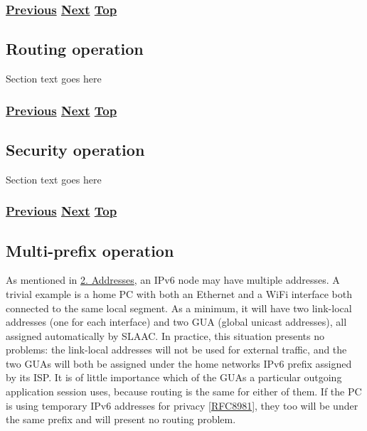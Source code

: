 \documentclass[
]{article}
\begin{document}
\subsubsection{\texorpdfstring{\hyperref[remote-configuration]{Previous}
\hyperref[routing-operation]{Next}
\hyperref[management-and-operations]{Top}}{Previous Next Top}}\label{previous-next-top-22}

\pagebreak

\subsection{Routing operation}\label{routing-operation}

Section text goes here

\subsubsection{\texorpdfstring{\hyperref[benchmarking-and-monitoring]{Previous}
\hyperref[security-operation]{Next}
\hyperref[management-and-operations]{Top}}{Previous Next Top}}\label{previous-next-top-23}

\pagebreak

\subsection{Security operation}\label{security-operation}

Section text goes here

\subsubsection{\texorpdfstring{\hyperref[routing-operation]{Previous}
\hyperref[multi-prefix-operation]{Next}
\hyperref[management-and-operations]{Top}}{Previous Next Top}}\label{previous-next-top-24}

\pagebreak

\subsection{Multi-prefix operation}\label{multi-prefix-operation}

As mentioned in \hyperref[addresses]{2. Addresses}, an IPv6 node may
have multiple addresses. A trivial example is a home PC with both an
Ethernet and a WiFi interface both connected to the same local segment.
As a minimum, it will have two link-local addresses (one for each
interface) and two GUA (global unicast addresses), all assigned
automatically by SLAAC. In practice, this situation presents no
problems: the link-local addresses will not be used for external
traffic, and the two GUAs will both be assigned under the home
network\textquotesingle s IPv6 prefix assigned by its ISP. It is of
little importance which of the GUAs a particular outgoing application
session uses, because routing is the same for either of them. If the PC
is using temporary IPv6 addresses for privacy
{[}\href{https://www.rfc-editor.org/info/rfc8981}{RFC8981}{]}, they too
will be under the same prefix and will present no routing problem.
\end{document}
